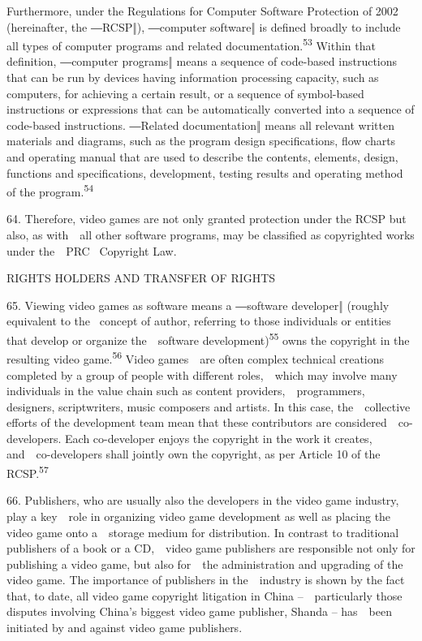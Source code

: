 \documentclass[
]{article}
\begin{document}
{Furthermore, under the }{Regulations for Computer Software Protection
of 2002 }{(hereinafter, the ―}{RCSP}{‖), ―computer software‖ is defined
broadly to include all types of }{computer programs and related
documentation.}\textsuperscript{{53 }}{Within that definition, ―computer
}{prog}{rams‖ means a sequence of code}{-based instructions that can be
run by devices having information processing capacity, such as
computers, for achieving a certain result, or a sequence of symbol-based
instructions or expressions that can be automatically converted into a
sequence of code-based instructions. }{―Related documentation‖ means
}{all relevant written materials and diagrams, such as the program
design specifications, flow charts and operating manual that are used to
describe the contents, elements, design, functions and specifications,
development, testing results and operating method of the
program.}\textsuperscript{{54}}

{64. }{Therefore, video games are not only granted protection under the
}{RCSP }{but also, as with~~all other software programs, may be
classified as copyrighted works under the~~PRC }{~Copyright Law}{.}

{RIGHTS HOLDERS AND TRANSFER OF RIGHTS}

{65. }{Viewing video games as software means a ―software developer‖
(roughly equivalent to the }{~concept of }{author}{, referring to those
individuals or entities that develop or organize the~~software
development)}\textsuperscript{{55 }}{owns the copyright in the resulting
video game.}\textsuperscript{{56 }}{Video games~~are often complex
technical creations completed by a group of people with different
roles,~~which may involve many individuals in the value chain such as
content providers,~~programmers, designers, scriptwriters, music
composers and artists. In this case, the~~collective efforts of the
development team mean that these contributors are
considered~~co-developers. Each co-developer enjoys the copyright in the
work it creates, and~~co-developers shall jointly own the copyright, as
per Article 10 of the }{RCSP}{.}\textsuperscript{{57}}

{66. }{Publishers, who are usually also the developers in the video game
industry, play a key~~role in organizing video game development as well
as placing the video game onto a~~storage medium for distribution. In
contrast to traditional publishers of a book or a CD,~~video game
publishers are responsible not only for publishing a video game, but
also for~~the administration and upgrading of the video game. The
importance of publishers in the~~industry is shown by the fact that, to
date, all video game copyright litigation in China }{--~~particularly
those disputes involving China's biggest video game publisher, Shanda --
}{has~~been initiated by and against video game publishers.}
\end{document}
